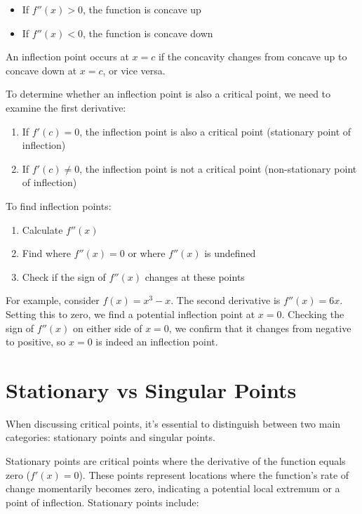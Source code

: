 \documentclass{article}
\begin{document}
\begin{itemize}
\item If \(f''(x) > 0\), the function is concave up
\item If \(f''(x) < 0\), the function is concave down
\end{itemize}

An inflection point occurs at \(x = c\) if the concavity changes from concave up to concave down at \(x = c\), or vice versa.

To determine whether an inflection point is also a critical point, we need to examine the first derivative:
\begin{enumerate}
\item If \(f'(c) = 0\), the inflection point is also a critical point (stationary point of inflection)
\item If \(f'(c) \neq 0\), the inflection point is not a critical point (non-stationary point of inflection)
\end{enumerate}

To find inflection points:
\begin{enumerate}
\item Calculate \(f''(x)\)
\item Find where \(f''(x) = 0\) or where \(f''(x)\) is undefined
\item Check if the sign of \(f''(x)\) changes at these points
\end{enumerate}

For example, consider \(f(x) = x^3 - x\). The second derivative is \(f''(x) = 6x\). Setting this to zero, we find a potential inflection point at \(x = 0\). Checking the sign of \(f''(x)\) on either side of \(x = 0\), we confirm that it changes from negative to positive, so \(x = 0\) is indeed an inflection point.

\section{Stationary vs Singular Points}

When discussing critical points, it's essential to distinguish between two main categories: stationary points and singular points.

Stationary points are critical points where the derivative of the function equals zero (\(f'(x) = 0\)). These points represent locations where the function's rate of change momentarily becomes zero, indicating a potential local extremum or a point of inflection. Stationary points include:
\end{document}
